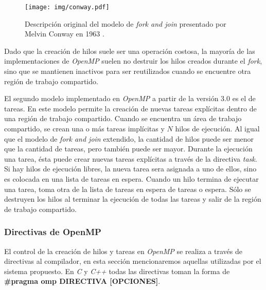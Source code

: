 \begin{figure}[!htb]

	\centering

	\texttt{[image: img/conway.pdf]}

	\caption{Descripción original del modelo de \emph{fork and join}
	presentado por Melvin Conway en 1963 \cite{conway1963}.}

	\label{conway}

\end{figure}

Dado que la creación de hilos suele ser una operación costosa, la mayoría de las
implementaciones de \emph{OpenMP} suelen no destruir los hilos creados durante
el \emph{fork}, sino que se mantienen inactivos para ser reutilizados cuando se
encuentre otra región de trabajo compartido.

El segundo modelo implementado en \emph{OpenMP} a partir de la versión 3.0 es el
de tareas. En este modelo permite la creación de nuevas tareas explícitas dentro
de una región de trabajo compartido. Cuando se encuentra un área de trabajo
compartido, se crean una o más tareas implícitas y $N$ hilos de ejecución. Al
igual que el modelo de \emph{fork and join} extendido, la cantidad de hilos
puede ser menor que la cantidad de tareas, pero también puede ser mayor. Durante
la ejecución una tarea, ésta puede crear nuevas tareas explícitas a través de la
directiva \emph{task}. Si hay hilos de ejecución libres, la nueva tarea sera
asignada a uno de ellos, sino es colocada en una lista de tareas en espera.
Cuando un hilo termina de ejecutar una tarea, toma otra de la lista de tareas en
espera de tareas o espera. Sólo se destruyen los hilos al terminar la ejecución
de todas las tareas y salir de la región de trabajo compartido.

\subsubsection{Directivas de OpenMP}

El control de la creación de hilos y tareas en \emph{OpenMP} se realiza a través
de directivas al compilador, en esta sección mencionaremos aquellas utilizadas
por el sistema propuesto. En \emph{C} y \emph{C++} todas las directivas toman la
forma de \textbf{\#pragma omp DIRECTIVA [OPCIONES]}.

